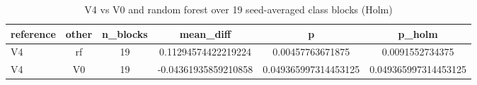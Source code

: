 \begin{table}[htbp]
\centering
\caption{V4 vs V0 and random forest over 19 seed-averaged class blocks (Holm)}
\label{tab:twin_wilcoxon}
\begin{tabular}{lccccc}
\toprule
reference & other & n\_blocks & mean\_diff & p & p\_holm \\
\midrule
V4 & rf & 19 & 0.11294574422219224 & 0.00457763671875 & 0.0091552734375 \\
V4 & V0 & 19 & -0.04361935859210858 & 0.049365997314453125 & 0.049365997314453125 \\
\bottomrule
\end{tabular}
\end{table}
